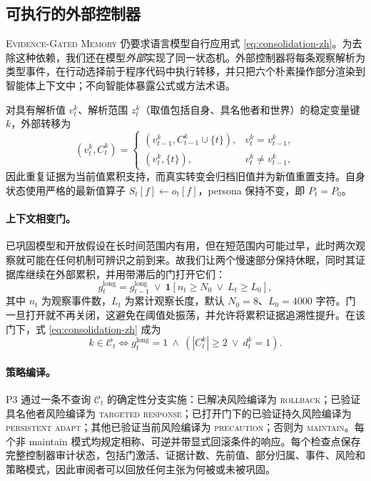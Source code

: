 \documentclass[UTF8,11pt]{ctexart}
\newcommand{\egm}{\textsc{Evidence-Gated Memory}}
\begin{document}
\subsection{可执行的外部控制器}\label{sec:controller-zh}

\egm{} 仍要求语言模型自行应用式 \ref{eq:consolidation-zh}。为去除这种依赖，我们还在模型\emph{外部}实现了同一状态机。外部控制器将每条观察解析为类型事件，在行动选择前于程序代码中执行转移，并只把六个朴素操作部分渲染到智能体上下文中；不向智能体暴露公式或方法术语。

对具有解析值 $v_t^k$、解析范围 $z_t^k$（取值包括自身、具名他者和世界）的稳定变量键 $k$，外部转移为
\begin{equation}
(v_t^k,C_t^k)=\begin{cases}
(v_{t-1}^k,C_{t-1}^k\cup\{t\}),&v_t^k=v_{t-1}^k,\\
(v_t^k,\{t\}),&v_t^k\ne v_{t-1}^k,
\end{cases}\label{eq:transition-zh}
\end{equation}
因此重复证据为当前值累积支持，而真实转变会归档旧值并为新值重置支持。自身状态使用严格的最新值算子 $S_t[f]\leftarrow o_t[f]$，persona 保持不变，即 $P_t=P_0$。

\paragraph{上下文相变门。} 已巩固模型和开放假设在长时间范围内有用，但在短范围内可能过早，此时两次观察就可能在任何机制可辨识之前到来。故我们让两个慢速部分保持休眠，同时其证据库继续在外部累积，并用带滞后的门打开它们：
\begin{equation}
g_t^{\mathrm{long}}=g_{t-1}^{\mathrm{long}}\ \lor\ \mathbf{1}[n_t\ge N_0\ \lor\ L_t\ge L_0],\label{eq:cptg-zh}
\end{equation}
其中 $n_t$ 为观察事件数，$L_t$ 为累计观察长度，默认 $N_0=8$、$L_0=4000$ 字符。门一旦打开就不再关闭，这避免在阈值处振荡，并允许将累积证据追溯性提升。在该门下，式 \ref{eq:consolidation-zh} 成为
\begin{equation}
k\in\mathcal{C}_t\iff g_t^{\mathrm{long}}=1\ \land\ (|C_t^k|\ge2\ \lor\ d_t^k=1).\label{eq:gated-consolidation-zh}
\end{equation}

\paragraph{策略编译。} P3 通过一条不查询 $\mathcal{C}_t$ 的确定性分支实施：已解决风险编译为 \textsc{rollback}；已验证具名他者风险编译为 \textsc{targeted response}；已打开门下的已验证持久风险编译为 \textsc{persistent adapt}；其他已验证当前风险编译为 \textsc{precaution}；否则为 \textsc{maintain}。每个非 maintain 模式均规定相称、可逆并带显式回滚条件的响应。每个检查点保存完整控制器审计状态，包括门激活、证据计数、先前值、部分归属、事件、风险和策略模式，因此审阅者可以回放任何主张为何被或未被巩固。
\end{document}
